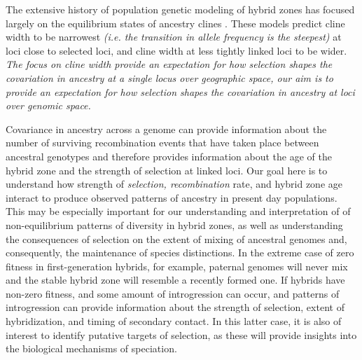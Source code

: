 \documentclass[12pt]{article}
\newcommand{\yb}[1]{{\em \color{magenta} #1}}
\begin{document}
The extensive history of population genetic modeling of hybrid zones has focused largely on the equilibrium states of ancestry clines \cite{Barton1979a,Barton1986}.  
These models predict cline width to be narrowest \yb{(i.e. the transition in allele frequency is the steepest)} at loci close to selected loci, and cline width at less tightly linked loci to be wider. %
\yb{The focus on cline width provide an expectation for how selection shapes the covariation in ancestry at a single locus over \emph{geographic space}, our aim is to provide an expectation for how selection shapes the covariation in ancestry at loci over \emph{genomic space.}}  

Covariance in ancestry across a genome can provide information about the number of surviving recombination events that have taken place between ancestral genotypes and therefore provides information about the age of the hybrid zone and the strength of selection at linked loci. 
Our goal here is  to understand how strength of \yb{selection, recombination} rate, and hybrid zone age interact to produce observed patterns of ancestry in present day populations.  
This may be especially important for our understanding and interpretation of of non-equilibrium patterns of diversity in hybrid zones, as well as understanding the consequences of selection on the extent of mixing of ancestral genomes and, consequently, the maintenance of species distinctions. In the extreme case of zero fitness in first-generation hybrids, for example, paternal genomes will never mix and the stable hybrid zone will resemble a recently formed one. If hybrids have non-zero fitness, and some amount of introgression can occur, and patterns of introgression can provide information about the strength of selection, extent of hybridization, and timing of secondary contact. In this latter case, it is also of interest to identify putative targets of selection, as these will provide insights into the biological mechanisms of speciation. 
\end{document}
